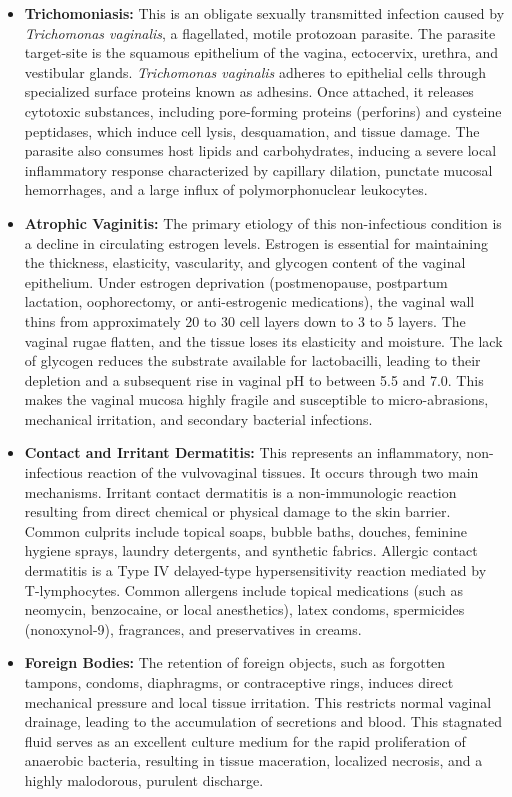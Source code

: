 \begin{itemize}
    \item \textbf{Trichomoniasis:} This is an obligate sexually transmitted infection caused by \textit{Trichomonas vaginalis}, a flagellated, motile protozoan parasite. The parasite target-site is the squamous epithelium of the vagina, ectocervix, urethra, and vestibular glands. \textit{Trichomonas vaginalis} adheres to epithelial cells through specialized surface proteins known as adhesins. Once attached, it releases cytotoxic substances, including pore-forming proteins (perforins) and cysteine peptidases, which induce cell lysis, desquamation, and tissue damage. The parasite also consumes host lipids and carbohydrates, inducing a severe local inflammatory response characterized by capillary dilation, punctate mucosal hemorrhages, and a large influx of polymorphonuclear leukocytes.
    \item \textbf{Atrophic Vaginitis:} The primary etiology of this non-infectious condition is a decline in circulating estrogen levels. Estrogen is essential for maintaining the thickness, elasticity, vascularity, and glycogen content of the vaginal epithelium. Under estrogen deprivation (postmenopause, postpartum lactation, oophorectomy, or anti-estrogenic medications), the vaginal wall thins from approximately 20 to 30 cell layers down to 3 to 5 layers. The vaginal rugae flatten, and the tissue loses its elasticity and moisture. The lack of glycogen reduces the substrate available for lactobacilli, leading to their depletion and a subsequent rise in vaginal pH to between 5.5 and 7.0. This makes the vaginal mucosa highly fragile and susceptible to micro-abrasions, mechanical irritation, and secondary bacterial infections.
    \item \textbf{Contact and Irritant Dermatitis:} This represents an inflammatory, non-infectious reaction of the vulvovaginal tissues. It occurs through two main mechanisms. Irritant contact dermatitis is a non-immunologic reaction resulting from direct chemical or physical damage to the skin barrier. Common culprits include topical soaps, bubble baths, douches, feminine hygiene sprays, laundry detergents, and synthetic fabrics. Allergic contact dermatitis is a Type IV delayed-type hypersensitivity reaction mediated by T-lymphocytes. Common allergens include topical medications (such as neomycin, benzocaine, or local anesthetics), latex condoms, spermicides (nonoxynol-9), fragrances, and preservatives in creams.
    \item \textbf{Foreign Bodies:} The retention of foreign objects, such as forgotten tampons, condoms, diaphragms, or contraceptive rings, induces direct mechanical pressure and local tissue irritation. This restricts normal vaginal drainage, leading to the accumulation of secretions and blood. This stagnated fluid serves as an excellent culture medium for the rapid proliferation of anaerobic bacteria, resulting in tissue maceration, localized necrosis, and a highly malodorous, purulent discharge.
\end{itemize}

